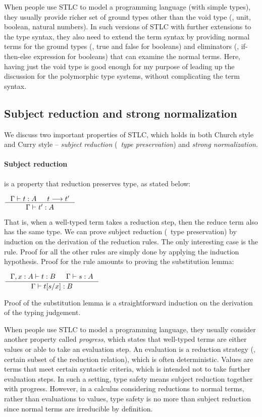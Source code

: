 When people use STLC to model a programming language (with simple types),
they usually provide richer set of ground types other than the void type
(\eg, unit, boolean, natural numbers). In such versions of STLC with further
extensions to the type syntax, they also need to extend the term syntax
by providing normal terms for the ground types (\eg, \textsf{true} and
\textsf{false} for booleans) and eliminators (\eg, if-then-else expression for
booleans) that can examine the normal terms. Here, having just the void type
is good enough for my purpose of leading up the discussion for
the polymorphic type systems, without complicating the term syntax.

\subsection{Subject reduction and strong normalization}\label{sec:stlc:srsn}
We discuss two important properties of STLC, which holds in both
Church style and Curry style -- \emph{subject reduction} (\aka\
\emph{type preservation}) and \emph{strong normalization}.

\paragraph{Subject reduction} is a property that reduction preserves type,
as stated below:
\begin{theorem}
	$\inference{\Gamma |- t : A  & t --> t'}{\Gamma |- t' : A}$
\end{theorem}
That is, when a well-typed term takes a reduction step, then the reduce term
also has the same type. We can prove subject reduction (\aka\ type preservation)
by induction on the derivation of the reduction rules.
The only interesting case is the  rule. Proof for all
the other rules are simply done by applying the induction hypothesis.
Proof for the \rulename{RedBeta} rule amounts to proving the substitution lemma:
\begin{lemma}[substitution]
$ \inference{\Gamma,x:A |- t : B  & \Gamma |- s : A}{\Gamma |- t[s/x] : B} $
\end{lemma}
Proof of the substitution lemma is a straightforward induction on
the derivation of the typing judgement.

When people use STLC to model a programming language,
they usually consider another property called \emph{progress},
which states that well-typed terms are either values or
able to take an evaluation step. An evaluation is a reduction strategy
(\ie, certain subset of the reduction relation), which is often deterministic.
Values are terms that meet certain syntactic criteria, which is intended not
to take further evaluation steps. In such a setting, type safety means
subject reduction together with progress. However, in a calculus considering
reductions to normal terms, rather than evaluations to values, type safety is
no more than subject reduction since normal terms are irreducible by definition.

